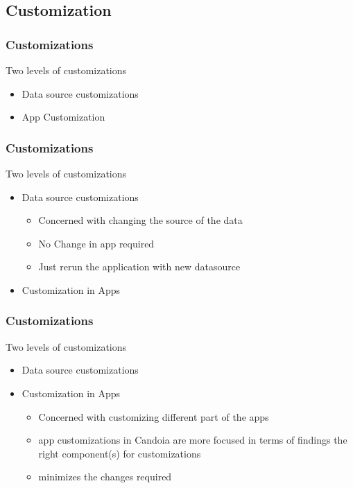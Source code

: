     \subsection{Customization}
        \begin{frame}
        \frametitle{Customizations}
            Two levels of customizations
            \begin{itemize}
                \item Data source customizations
                \item App Customization
            \end{itemize}
        \end{frame}

        \begin{frame}
        \frametitle{Customizations}
            Two levels of customizations
            \begin{itemize}
                \item Data source customizations
                    \begin{itemize}
                        \item Concerned with changing the source of the data
                        \item No Change in app required
                        \item Just rerun the application with new datasource
                    \end{itemize}
                \item Customization in Apps
            \end{itemize}
        \end{frame}

        \begin{frame}
        \frametitle{Customizations}
            Two levels of customizations
            \begin{itemize}
                \item Data source customizations
                \item Customization in Apps
                    \begin{itemize}
                        \item Concerned with customizing different part of the apps
                        \item app customizations in Candoia are more focused in terms of findings the right component(s) for customizations
                        \item minimizes the changes required
                    \end{itemize}
            \end{itemize}
        \end{frame}

